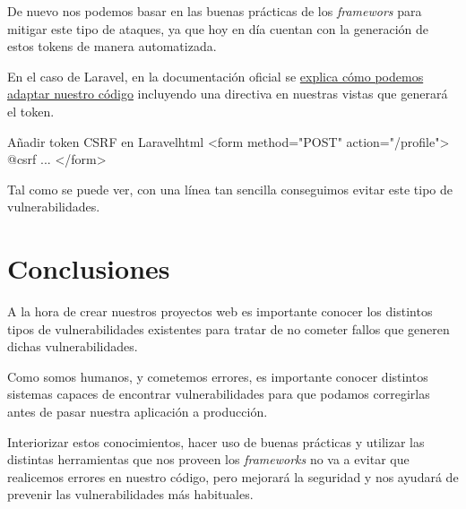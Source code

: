 \documentclass{\ClassPath/viu-tfm-template}
\begin{document}
De nuevo nos podemos basar en las buenas prácticas de los \textit{framewors} para mitigar este tipo de ataques, ya que hoy en día cuentan con la generación de estos tokens de manera automatizada.

En el caso de Laravel, en la documentación oficial se \href{https://laravel.com/docs/6.x/csrf}{explica cómo podemos adaptar nuestro código} incluyendo una directiva en nuestras vistas que generará el token.

\begin{mycode}{Añadir token CSRF en Laravel}{html}{}
<form method="POST" action="/profile">
    @csrf
    ...
</form>
\end{mycode}

Tal como se puede ver, con una línea tan sencilla conseguimos evitar este tipo de vulnerabilidades.



\chapter{Conclusiones}

A la hora de crear nuestros proyectos web es importante conocer los distintos tipos de vulnerabilidades existentes para tratar de no cometer fallos que generen dichas vulnerabilidades.

Como somos humanos, y cometemos errores, es importante conocer distintos sistemas capaces de encontrar  vulnerabilidades para que podamos corregirlas antes de pasar nuestra aplicación a producción.

Interiorizar estos conocimientos, hacer uso de buenas prácticas y utilizar las distintas herramientas que nos proveen los \textit{frameworks} no va a evitar que realicemos errores en nuestro código, pero mejorará la seguridad y nos ayudará de prevenir las vulnerabilidades más habituales.
\end{document}
